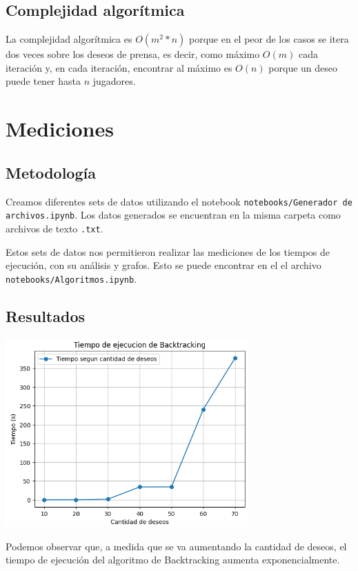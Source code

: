 \documentclass{estilo}
\begin{document}
\subsection{Complejidad algorítmica}

La complejidad algorítmica es $O(m^2 * n)$ porque en el peor de los casos se itera dos veces sobre los deseos de prensa, es decir, como máximo $O(m)$ cada iteración y, en cada iteración, encontrar al máximo es $O(n)$ porque un deseo puede tener hasta $n$ jugadores.

\newpage

\section{Mediciones}
\subsection{Metodología}

Creamos diferentes sets de datos utilizando el notebook \texttt{notebooks/Generador de archivos.ipynb}. Los datos generados se encuentran en la misma carpeta como archivos de texto \texttt{.txt}.

Estos sets de datos nos permitieron realizar las mediciones de los tiempos de ejecución, con su análisis y grafos. Esto se puede encontrar en el el archivo \texttt{notebooks/Algoritmos.ipynb}.

\subsection{Resultados}

\begin{center}
\includegraphics[width=0.7\textwidth]{img/tiempo_backtracking.png}

Podemos observar que, a medida que se va aumentando la cantidad de deseos, el tiempo de ejecución del algoritmo de Backtracking aumenta exponencialmente.
\end{center}
\end{document}
